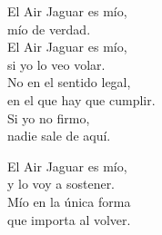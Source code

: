 \begin{lyrics}
El Air Jaguar es mío,\\
mío de verdad.\\
El Air Jaguar es mío,\\
si yo lo veo volar.\\
No en el sentido legal,\\
en el que hay que cumplir.\\
Si yo no firmo,\\
nadie sale de aquí.

El Air Jaguar es mío,\\
y lo voy a sostener.\\
Mío en la única forma\\
que importa al volver.
\end{lyrics}
